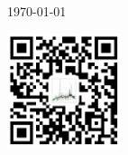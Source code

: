 \documentclass[UTF8]{ctexart}
\begin{document}
\begin{titlepage}
  {\large \today\par}
  \vspace*{\baselineskip}
\vfill
  \raggedleft
  \includegraphics[width=0.25\textwidth]{QR-code.png}

\end{titlepage}
 
\end{document}
